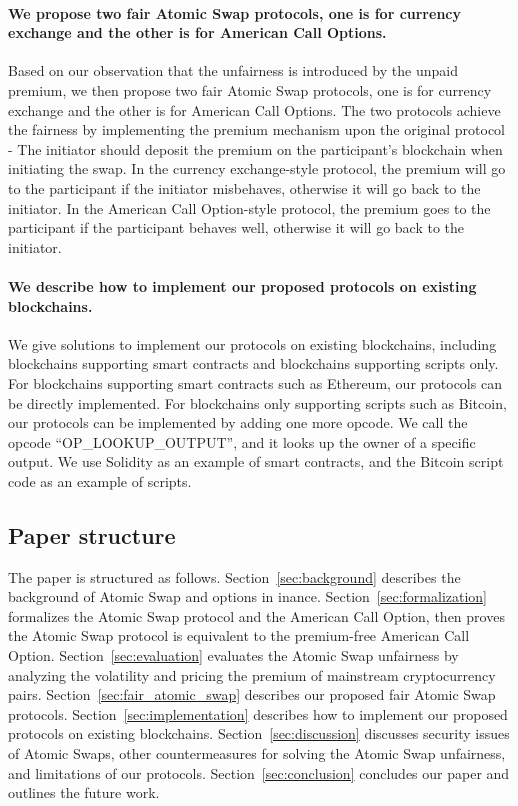 \paragraph{We propose two fair Atomic Swap protocols, one is for currency exchange and the other is for American Call Options.}
Based on our observation that the unfairness is introduced by the unpaid premium,
we then propose two fair Atomic Swap protocols, one is for currency exchange and the other is for American Call Options.
The two protocols achieve the fairness by implementing the premium mechanism upon the original protocol - The initiator should deposit the premium on the participant's blockchain when initiating the swap.
In the currency exchange-style protocol, the premium will go to the participant if the initiator misbehaves, otherwise it will go back to the initiator.
In the American Call Option-style protocol, the premium goes to the participant if the participant behaves well, otherwise it will go back to the initiator.

\paragraph{We describe how to implement our proposed protocols on existing blockchains.}
We give solutions to implement our protocols on existing blockchains, including blockchains supporting smart contracts and blockchains supporting scripts only.
For blockchains supporting smart contracts such as Ethereum, our protocols can be directly implemented.
For blockchains only supporting scripts such as Bitcoin, our protocols can be implemented by adding one more opcode.
We call the opcode ``OP\_LOOKUP\_OUTPUT'', and it looks up the owner of a specific output.
We use Solidity as an example of smart contracts, and the Bitcoin script code as an example of scripts.










\subsection{Paper structure}

The paper is structured as follows.
Section~\ref{sec:background} describes the background of Atomic Swap and options in inance.
Section~\ref{sec:formalization} formalizes the Atomic Swap protocol and the American Call Option, then proves the Atomic Swap protocol is equivalent to the premium-free American Call Option.
Section~\ref{sec:evaluation} evaluates the Atomic Swap unfairness by analyzing the volatility and pricing the premium of mainstream cryptocurrency pairs.
Section~\ref{sec:fair_atomic_swap} describes our proposed fair Atomic Swap protocols.
Section~\ref{sec:implementation} describes how to implement our proposed protocols on existing blockchains.
Section~\ref{sec:discussion} discusses security issues of Atomic Swaps, other countermeasures for solving the Atomic Swap unfairness, and limitations of our protocols.
Section~\ref{sec:conclusion} concludes our paper and outlines the future work.